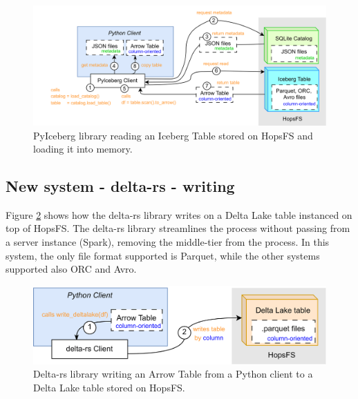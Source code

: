\begin{figure}
    \begin{center}
      \includegraphics[width=\textwidth]{figures/2-background_and_related_work/iceberg_read.png}
    \end{center}
    \caption[New system - PyIceberg - read process]{PyIceberg library reading an Iceberg Table stored on \gls{HopsFS} and loading it into memory.}
    \label{fig:iceberg_read}
\end{figure}



\subsection{New system - delta-rs - writing}
\label{subsec:back_sys_delta_write}

Figure \ref{fig:delta_write} shows how the delta-rs library writes on a Delta Lake table instanced on top of \gls{HopsFS}. The delta-rs library streamlines the process without passing from a server instance (Spark), removing the middle-tier from the process. In this system, the only file format supported is Parquet, while the other systems supported also ORC and Avro.

\begin{figure}
    \begin{center}
      \includegraphics[width=\textwidth]{figures/2-background_and_related_work/delta_write.png}
    \end{center}
    \caption[New system - delta-rs - write process]{Delta-rs library writing an Arrow Table from a Python client to a Delta Lake table stored on \gls{HopsFS}.}
    \label{fig:delta_write}
\end{figure}




